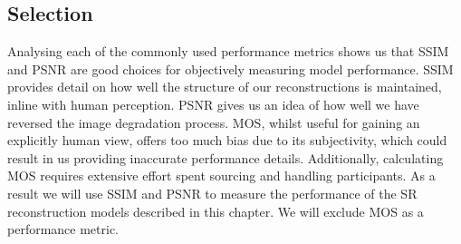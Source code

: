 \subsection{Selection}
Analysing each of the commonly used performance metrics shows us that SSIM and PSNR are good choices for objectively measuring model performance. SSIM provides detail on how well the structure of our reconstructions is maintained, inline with human perception. PSNR gives us an idea of how well we have reversed the image degradation process. MOS, whilst useful for gaining an explicitly human view, offers too much bias due to its subjectivity, which could result in us providing inaccurate performance details. Additionally, calculating MOS requires extensive effort spent sourcing and handling participants. As a result we will use SSIM and PSNR to measure the performance of the SR reconstruction models described in this chapter. We will exclude MOS as a performance metric.